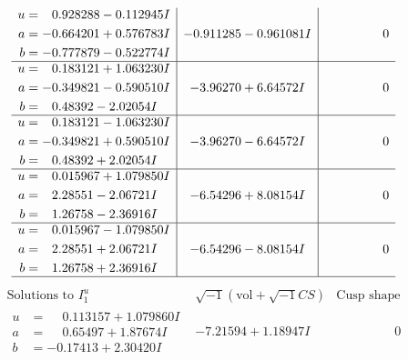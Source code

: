 \documentclass[1p]{elsarticle_modified}
\theoremstyle{definition}
\newcommand{\I}{\sqrt{-1}}
\begin{document}
$$\begin{array}{c|c|c}
\begin{aligned}
u &= \phantom{-}0.928288 - 0.112945 I \\
a &= -0.664201 + 0.576783 I \\
b &= -0.777879 - 0.522774 I\end{aligned}
 & -0.911285 - 0.961081 I & \phantom{-0.000000 } 0 \\ \hline\begin{aligned}
u &= \phantom{-}0.183121 + 1.063230 I \\
a &= -0.349821 - 0.590510 I \\
b &= \phantom{-}0.48392 - 2.02054 I\end{aligned}
 & -3.96270 + 6.64572 I & \phantom{-0.000000 } 0 \\ \hline\begin{aligned}
u &= \phantom{-}0.183121 - 1.063230 I \\
a &= -0.349821 + 0.590510 I \\
b &= \phantom{-}0.48392 + 2.02054 I\end{aligned}
 & -3.96270 - 6.64572 I & \phantom{-0.000000 } 0 \\ \hline\begin{aligned}
u &= \phantom{-}0.015967 + 1.079850 I \\
a &= \phantom{-}2.28551 - 2.06721 I \\
b &= \phantom{-}1.26758 - 2.36916 I\end{aligned}
 & -6.54296 + 8.08154 I & \phantom{-0.000000 } 0 \\ \hline\begin{aligned}
u &= \phantom{-}0.015967 - 1.079850 I \\
a &= \phantom{-}2.28551 + 2.06721 I \\
b &= \phantom{-}1.26758 + 2.36916 I\end{aligned}
 & -6.54296 - 8.08154 I & \phantom{-0.000000 } 0\\
 \hline 
 \end{array}$$\newpage$$\begin{array}{c|c|c}  
\text{Solutions to }I^u_{1}& \I (\text{vol} + \sqrt{-1}CS) & \text{Cusp shape}\\
 \hline 
\begin{aligned}
u &= \phantom{-}0.113157 + 1.079860 I \\
a &= \phantom{-}0.65497 + 1.87674 I \\
b &= -0.17413 + 2.30420 I\end{aligned}
 & -7.21594 + 1.18947 I & \phantom{-0.000000 } 0 \\ \hline\begin{aligned}

\end{aligned}
\end{array}$$
\end{document}
